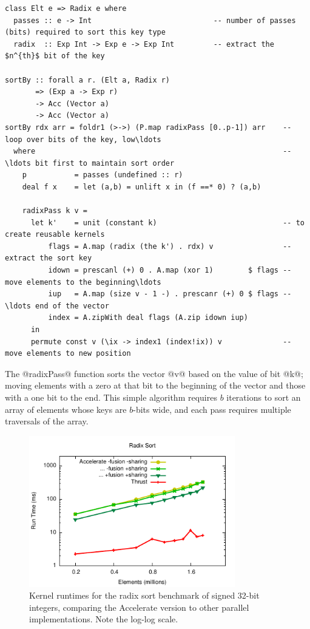 \begin{lstlisting}[style=haskell_float
    ,label=lst:radixsort
    ,caption={Radix sort algorithm}]
class Elt e => Radix e where
  passes :: e -> Int                            -- number of passes (bits) required to sort this key type
  radix  :: Exp Int -> Exp e -> Exp Int         -- extract the $n^{th}$ bit of the key

sortBy :: forall a r. (Elt a, Radix r)
       => (Exp a -> Exp r)
       -> Acc (Vector a)
       -> Acc (Vector a)
sortBy rdx arr = foldr1 (>->) (P.map radixPass [0..p-1]) arr    -- loop over bits of the key, low\ldots
  where                                                         -- \ldots bit first to maintain sort order
    p           = passes (undefined :: r)
    deal f x    = let (a,b) = unlift x in (f ==* 0) ? (a,b)

    radixPass k v =
      let k'    = unit (constant k)                             -- to create reusable kernels
          flags = A.map (radix (the k') . rdx) v                -- extract the sort key
          idown = prescanl (+) 0 . A.map (xor 1)        $ flags -- move elements to the beginning\ldots
          iup   = A.map (size v - 1 -) . prescanr (+) 0 $ flags -- \ldots end of the vector
          index = A.zipWith deal flags (A.zip idown iup)
      in
      permute const v (\ix -> index1 (index!ix)) v              -- move elements to new position
\end{lstlisting}

The @radixPass@ function sorts the vector @v@ based on the value of
bit @k@; moving elements with a zero at that bit to the beginning of the
vector and those with a one bit to the end. This simple algorithm requires
$b$ iterations to sort an array of elements whose keys are $b$-bits wide, and
each pass requires multiple traversals of the array.

\begin{figure}
    \begin{center}
        \includegraphics[width=0.8\textwidth]{images/sec-6/radixsort/radixsort}
    \end{center}
    \caption[Radix sort kernel benchmarks]{Kernel runtimes for the radix sort benchmark
        of signed 32-bit integers, comparing the Accelerate version to other
        parallel implementations. Note the log-log scale.}
    \label{fig:radixsort}
\end{figure}

